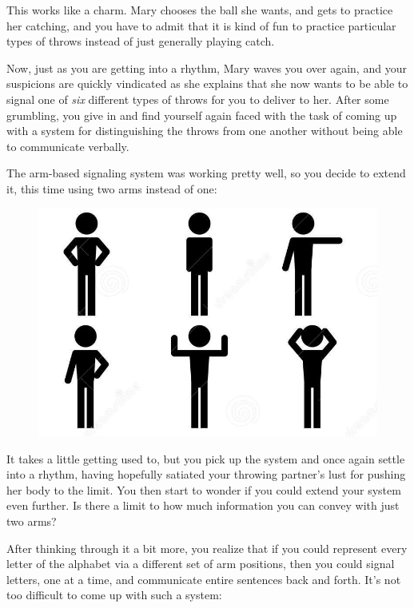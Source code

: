 \documentclass[UTF8]{book}
\begin{document}
\begin{CJK}{UTF8}{gbsn}
This works like a charm. Mary chooses the ball she wants, and gets to practice her catching, and you have to admit that it is kind of fun to practice particular types of throws instead of just generally playing catch.

Now, just as you are getting into a rhythm, Mary waves you over again, and your suspicions are quickly vindicated as she explains that she now wants to be able to signal one of \emph{six} different types of throws for you to deliver to her. After some grumbling, you give in and find yourself again faced with the task of coming up with a system for distinguishing the throws from one another without being able to communicate verbally.

The arm-based signaling system was working pretty well, so you decide to extend it, this time using two arms instead of one:

\begin{figure}[H]
\centering
\includegraphics{stick-figure-six-positions-simplified}
\end{figure}

It takes a little getting used to, but you pick up the system and once again settle into a rhythm, having hopefully satiated your throwing partner's lust for pushing her body to the limit. You then start to wonder if you could extend your system even further. Is there a limit to how much information you can convey with just two arms?

After thinking through it a bit more, you realize that if you could represent every letter of the alphabet via a different set of arm positions, then you could signal letters, one at a time, and communicate entire sentences back and forth. It's not too difficult to come up with such a system:


\end{CJK}
\end{document}
